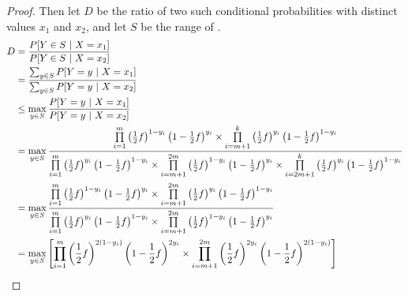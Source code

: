\documentclass{article}
\begin{document}
\begin{enumerate}
\begin{proof}
	Then let $D$ be the ratio of two such conditional probabilities with distinct values $x_1$ and $x_2$, and let $S$ be the range of .
	\begin{align}
		D &= \frac{P[Y\in S~|~X=x_1]}{P[Y\in S~|~X=x_2]}\\
			&= \frac{\sum_{y\in S}P[Y=y~|~X=x_1]}{\sum_{y\in S}P[Y=y~|~X=x_2]}\nonumber\\
			&\leq \max_{y\in S}\frac{P[Y=y~|~X=x_1]}{P[Y=y~|~X=x_2]}\nonumber\\
			&=\max_{y\in S}\frac{%
				\prod\limits_{i=1}^m \left(\frac{1}{2}f\right)^{1-y_i}\left(1-\frac{1}{2}f\right)^{y_i}%
				\times \prod\limits_{i=m+1}^k\left(\frac{1}{2}f\right)^{y_i} \left(1-\frac{1}{2}f\right)^{1-y_i}
			}{%
				\prod\limits_{i=1}^m \left(\frac{1}{2}f\right)^{y_i}\left(1-\frac{1}{2}f\right)^{1-y_i}%
				\times \prod\limits_{i=m+1}^{2m}\left(\frac{1}{2}f\right)^{1-y_i} \left(1-\frac{1}{2}f\right)^{y_i}\times%
				\prod\limits_{i=2m+1}^{k}\left(\frac{1}{2}f\right)^{y_i}\left(1-\frac{1}{2}f\right)^{1-y_i}
			}\nonumber\\
			&=\max_{y\in S}\frac{%
				\prod\limits_{i=1}^m \left(\frac{1}{2}f\right)^{1-y_i}\left(1-\frac{1}{2}f\right)^{y_i}%
				\times \prod\limits_{i=m+1}^{2m}\left(\frac{1}{2}f\right)^{y_i} \left(1-\frac{1}{2}f\right)^{1-y_i}%
			}{%
				\prod\limits_{i=1}^m \left(\frac{1}{2}f\right)^{y_i}\left(1-\frac{1}{2}f\right)^{1-y_i}%
				\times \prod\limits_{i=m+1}^{2m}\left(\frac{1}{2}f\right)^{1-y_i} \left(1-\frac{1}{2}f\right)^{y_i}%
			}\label{eq:privacy:cancel-k}\\
			&=\max_{y\in S}\left[%
				\prod\limits_{i=1}^m \left(\frac{1}{2}f\right)^{2(1-y_i)}\left(1-\frac{1}{2}f\right)^{2y_i}%
				\times \prod\limits_{i=m+1}^{2m}\left(\frac{1}{2}f\right)^{2y_i} \left(1-\frac{1}{2}f\right)^{2(1-y_i)}\right]\label{eq:maximise-product}%

\end{align}
\end{proof}
\end{enumerate}
\end{document}
